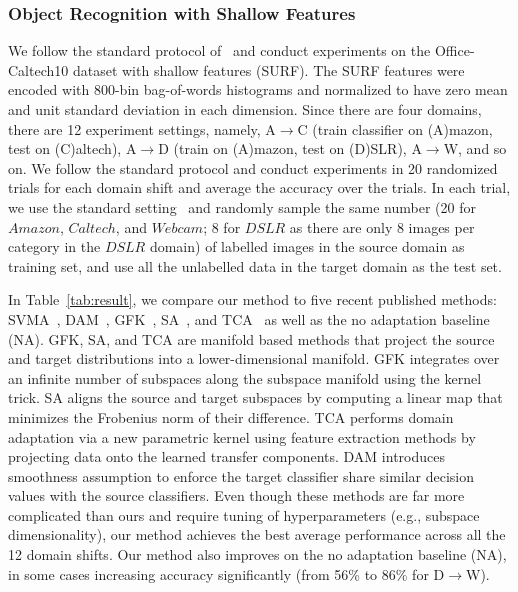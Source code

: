 \documentclass[letterpaper]{article}
\begin{document}
\subsubsection{Object Recognition with Shallow Features}  
We follow the standard protocol of~\cite{gfk,sasb,gopalan-iccv11,ref:kulis_cvpr11,saenko2010adapting} and conduct experiments on the Office-Caltech10 dataset with shallow features (SURF).
The SURF features were encoded with 800-bin bag-of-words histograms and normalized to have zero mean and unit standard deviation in each dimension.  Since there are four domains, there are 12 experiment settings, namely, A$\rightarrow$C (train classifier on (A)mazon, test on (C)altech), A$\rightarrow$D (train on (A)mazon, test on (D)SLR), A$\rightarrow$W, and so on. We follow the standard protocol and conduct experiments in 20 randomized trials for each domain shift and average the accuracy over the trials. In each trial, we use the standard setting~\cite{gfk,sasb,gopalan-iccv11,ref:kulis_cvpr11,saenko2010adapting} and randomly sample the same number (20 for $Amazon$, $Caltech$, and $Webcam$; 8 for $DSLR$ as there are only 8 images per category in the $DSLR$ domain) of labelled images in the source domain as training set, and use all the unlabelled data in the target domain as the test set. 

In Table~\ref{tab:result}, we compare our method to five recent published methods: SVMA~\cite{svma}, DAM~\cite{ref:duan09}, GFK~\cite{gfk}, SA~\cite{sasb}, and TCA~\cite{tca} as well as the no adaptation baseline (NA). GFK, SA, and TCA are manifold based methods that project the source and target distributions into a lower-dimensional manifold. GFK integrates over an infinite number of subspaces along the subspace manifold using the kernel trick. SA aligns the source and target subspaces by computing a linear map that minimizes the Frobenius norm of their difference. TCA performs domain adaptation via a new parametric kernel using feature extraction methods by projecting data onto the learned transfer components. DAM introduces smoothness assumption to enforce the target classifier share similar decision values with the source classifiers. Even though these methods are far more complicated than ours and require tuning of hyperparameters (e.g., subspace dimensionality), our method achieves the best average performance across all the 12 domain shifts. Our method also improves on the no adaptation baseline (NA), in some cases increasing accuracy significantly (from 56\% to 86\% for D$\rightarrow$W). 
\end{document}
